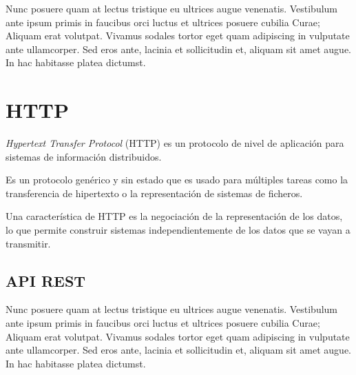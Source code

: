 Nunc posuere quam at lectus tristique eu ultrices augue venenatis. Vestibulum ante ipsum primis in faucibus orci luctus et ultrices posuere cubilia Curae; Aliquam erat volutpat. Vivamus sodales tortor eget quam adipiscing in vulputate ante ullamcorper. Sed eros ante, lacinia et sollicitudin et, aliquam sit amet augue. In hac habitasse platea dictumst.


\section{HTTP}

\emph{Hypertext Transfer Protocol} (HTTP) es un protocolo de nivel de aplicación para sistemas de información distribuidos.

Es un protocolo genérico y sin estado que es usado para múltiples tareas como la transferencia de hipertexto o la representación de sistemas de ficheros.

Una característica de HTTP es la negociación de la representación de los datos, lo que permite construir sistemas independientemente de los datos que se vayan a transmitir. \emph{\parencite{ReferenceX}}

\subsection{API REST}

Nunc posuere quam at lectus tristique eu ultrices augue venenatis. Vestibulum ante ipsum primis in faucibus orci luctus et ultrices posuere cubilia Curae; Aliquam erat volutpat. Vivamus sodales tortor eget quam adipiscing in vulputate ante ullamcorper. Sed eros ante, lacinia et sollicitudin et, aliquam sit amet augue. In hac habitasse platea dictumst.

